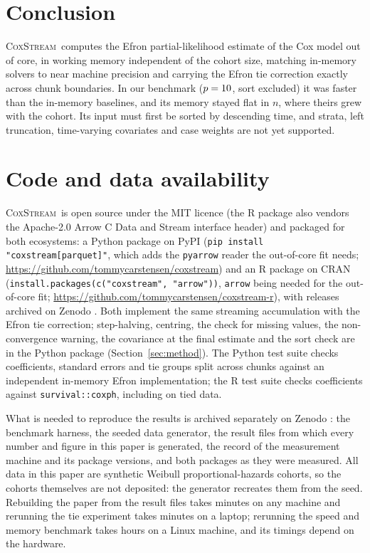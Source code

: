 \documentclass[11pt,a4paper]{article}
\newcommand{\coxstream}{\textsc{CoxStream}}
\begin{document}
\section{Conclusion}
\label{sec:conclusion}

\coxstream\ computes the Efron partial-likelihood estimate of the Cox model
out of core, in working memory independent of the cohort size, matching
in-memory solvers to near machine precision and carrying the Efron tie
correction exactly across chunk boundaries. In our benchmark ($p =
10$, sort excluded) it was faster than the in-memory baselines, and
its memory stayed flat in $n$, where theirs grew with the cohort. Its input
must first be sorted by descending time, and strata, left truncation,
time-varying covariates and case weights are not yet supported.

\section*{Code and data availability}

\coxstream\ is open source under the MIT licence (the R package also vendors
the Apache-2.0 Arrow C Data and Stream interface header) and packaged for both
ecosystems: a Python package on PyPI (\texttt{pip install "coxstream[parquet]"},
which adds the \texttt{pyarrow} reader the out-of-core fit needs;
\url{https://github.com/tommycarstensen/coxstream}) and an R package on CRAN
(\texttt{install.packages(c("coxstream", "arrow"))}, \texttt{arrow} being needed
for the out-of-core fit; \url{https://github.com/tommycarstensen/coxstream-r}),
with releases archived on Zenodo \citep{coxstream2026,coxstreamr2026}. Both
implement the same streaming accumulation with the Efron tie correction;
step-halving, centring, the check for missing values, the non-convergence
warning, the covariance at the final estimate and the sort check are in the
Python package (Section~\ref{sec:method}). The Python test suite
checks coefficients, standard errors and tie groups split across chunks against
an independent in-memory Efron implementation; the R test suite checks
coefficients against \texttt{survival::coxph}, including on tied data.

What is needed to reproduce the results is archived separately on Zenodo
\citep{coxstreampaper2026}: the benchmark harness, the seeded data generator,
the result files from which every number and figure in this paper is
generated, the record of the measurement machine and its package versions, and
both packages as they were measured. All data in this paper are synthetic
Weibull proportional-hazards cohorts, so the cohorts themselves are not
deposited: the generator recreates them from the seed. Rebuilding the paper
from the result files takes minutes on any machine and rerunning the tie
experiment takes minutes on a laptop; rerunning the speed and memory benchmark
takes hours on a Linux machine, and its timings depend on the hardware.
\end{document}
